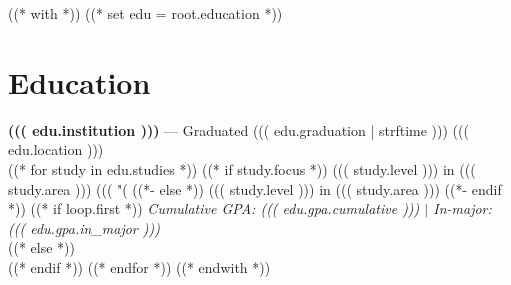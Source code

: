 ((* with *))
((* set edu = root.education *))
\section{Education}\relax
    {\large\textbf{((( edu.institution )))}} --- Graduated ((( edu.graduation | strftime ))) \hfill{\small ((( edu.location )))}\\
((* for study in edu.studies *))
        ((* if study.focus *))
    ((( study.level ))) in ((( study.area ))) ((( "(%
        ((*- else *))
    ((( study.level ))) in ((( study.area )))
        ((*- endif *))
        ((* if loop.first *))
 \hfill \emph{Cumulative GPA: ((( edu.gpa.cumulative ))) $|$ In-major: ((( edu.gpa.in_major )))}\\
        ((* else *))
\\
        ((* endif *))
((* endfor *))
((* endwith *))
